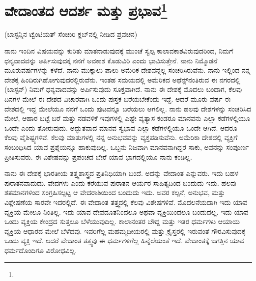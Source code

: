 
\chapter[ವೇದಾಂತದ ಆದರ್ಶ ಮತ್ತು ಪ್ರಭಾವ]{ವೇದಾಂತದ ಆದರ್ಶ ಮತ್ತು ಪ್ರಭಾವ\protect\footnote{}}

\begin{center}
(ಬಾಸ್ಟನ್ನಿನ ಟ್ವೆಂಟಿಯತ್ ಸೆಂಚುರಿ ಕ್ಲಬ್‌ನಲ್ಲಿ ನೀಡಿದ ಪ್ರವಚನ)
\end{center}

ನಾನು ಇಂದಿನ ವಿಷಯವನ್ನು ಕುರಿತು ಮಾತನಾಡುವುದಕ್ಕೆ ಮುಂಚೆ ಸ್ವಲ್ಪ ಕಾಲಾವಕಾಶವಿರುವುದರಿಂದ, ನಿಮಗೆ ಧನ್ಯವಾದವನ್ನು ಅರ್ಪಿಸುವುದಕ್ಕೆ ನನಗೆ ಅವಕಾಶ ಕೊಡುವಿರಿ ಎಂದು ಭಾವಿಸುತ್ತೇನೆ. ನಾನು ನಿಮ್ಮೊಡನೆ ಮೂರುವರ್ಷಗಳನ್ನು ಕಳೆದೆ. ನಾನು ಮುಕ್ಕಾಲು ಪಾಲು ಅಮೆರಿಕ ದೇಶವನ್ನೆಲ್ಲ ಸಂಚರಿಸಿರುವೆನು. ನಾನು ಇಲ್ಲಿಂದ ನನ್ನ ದೇಶಕ್ಕೆ ಹಿಂದಿರುಗಿಹೋಗುವುದರಲ್ಲಿರುವೆನು. ಇಂತಹ ಸಮಯದಲ್ಲಿ ಅಮೆರಿಕದ ಅಥೆನ್ಸ್‌ನಂತಿರುವ ಈ ನಗರದಲ್ಲಿ (ಬಾಸ್ಟನ್) ನಿಮಗೆ ಧನ್ಯವಾದವನ್ನು ಅರ್ಪಿಸುವುದು ಸೂಕ್ತವಾಗಿದೆ. ನಾನು ಈ ದೇಶಕ್ಕೆ ಮೊದಲು ಬಂದಾಗ, ಕೆಲವು ದಿನಗಳ ಮೇಲೆ ಈ ದೇಶದ ವಿಚಾರವಾಗಿ ಒಂದು ಪುಸ್ತಕ ಬರೆಯಬೇಕೆಂದು ಇದ್ದೆ. ಆದರೆ ಮೂರು ವರ್ಷ ಈ ದೇಶದಲ್ಲಿ ಇದ್ದ ಮೇಲೆಯೂ ನನಗೆ ಒಂದು ಪುಟವನ್ನೂ ಬರೆಯಲು ಆಗಲಿಲ್ಲ. ನಾನು ಹಲವು ದೇಶಗಳನ್ನು ಸಂಚರಿಸಿದ ಮೇಲೆ, ಆಹಾರ ಬಟ್ಟೆ ಬರೆ ಮತ್ತು ನಡವಳಿಕೆ ಇವುಗಳಲ್ಲಿ ಎಷ್ಟೇ ವ್ಯತ್ಯಾಸ ಕಂಡರೂ ಮಾನವನು ಎಲ್ಲಾ ಕಡೆಗಳಲ್ಲಿಯೂ ಒಂದೇ ಎಂದು ತೋರುವುದು. ಅದ್ಭುತವಾದ ಮಾನವ ಸ್ವಭಾವ ಎಲ್ಲಾ ಕಡೆಗಳಲ್ಲಿಯೂ ಒಂದೇ ಆಗಿದೆ. ಆದರೂ ಕೆಲವು ವೈಶಿಷ್ಟ್ಯಗಳಿವೆ. ಕೆಲವು ಮಾತುಗಳಲ್ಲಿ ನನ್ನ ಅನುಭವವನ್ನು ವ್ಯಕ್ತಪಡಿಸುವೆನು. ಅಮೆರಿಕಾ ದೇಶದಲ್ಲಿ ವ್ಯಕ್ತಿಗೆ ಸಂಬಂಧಿಸಿದ ಯಾವ ಪ್ರಶ್ನೆಯನ್ನೂ ಹಾಕುವುದಿಲ್ಲ. ಒಬ್ಬನು ನಿಜವಾಗಿ ಮಾನವನಾಗಿದ್ದರೆ ಸಾಕು, ಅವನನ್ನು ಸಂಪೂರ್ಣ ಪ್ರೀತಿಸುವರು. ಈ ವಿಶೇಷವನ್ನು ಪ್ರಪಂಚದ ಬೇರೆ ಯಾವ ಭಾಗದಲ್ಲಿಯೂ ನಾನು ಕಂಡಿಲ್ಲ.

ನಾನು ಈ ದೇಶಕ್ಕೆ ಭಾರತೀಯ ತತ್ತ್ವಶಾಸ್ತ್ರದ ಪ್ರತಿನಿಧಿಯಾಗಿ ಬಂದೆ. ಅದನ್ನು ವೇದಾಂತ ಎನ್ನುವರು. ಇದು ಬಹಳ ಪುರಾತನವಾದುದು. ವೇದಗಳು ಎಂದು ಕರೆಯುವ ಪುರಾತನ ಆರ್ಯರ ಸಾಹಿತ್ಯದಿಂದ ಬಂದುದು ಇದು. ಹಲವು ಶತಮಾನಗಳಿಂದ ಸಂಗ್ರಹಿಸಲ್ಪಟ್ಟ ಆ ವೇದರಾಶಿಯಿಂದ ಬಂದುದು ಇದು. ಅವರ ಕಲ್ಪನೆ, ಅನುಭವ, ಮತ್ತು ವಿಶ್ಲೇಷಣೆಯ ಸಾರವೇ ಇದರಲ್ಲಿದೆ. ಈ ವೇದಾಂತ ತತ್ತ್ವದಲ್ಲಿ ಕೆಲವು ವಿಶೇಷಗಳಿವೆ. ಮೊದಲನೆಯದಾಗಿ ಇದು ಯಾವ ವ್ಯಕ್ತಿಯ ಮೇಲೂ ನಿಂತಿಲ್ಲ. ಇದು ಯಾವ ದೇವದೂತನಿಂದಲೂ ಅಥವಾ ವ್ಯಕ್ತಿಯಿಂದಲೂ ಬಂದುದಲ್ಲ. ಇದು ಯಾವ ಒಂದು ವ್ಯಕ್ತಿಯ ಕೇಂದ್ರದ ಸುತ್ತಲೂ ಬೆಳೆಯುವುದಿಲ್ಲ. ಕಾಲಾನಂತರ ಬೌದ್ದ ಮತ್ತು ಇತರ ಧರ್ಮಗಳು ಆಯಾಯ ವ್ಯಕ್ತಿಯ ಆಧಾರದ ಮೇಲೆ ಬೆಳೆದವು. ಇವರಿಗೆಲ್ಲ ಮಹಮ್ಮದೀಯರಲ್ಲಿ ಮತ್ತು ಕ್ರೈಸ್ತರಲ್ಲಿ ಇರುವಂತೆ ಗೌರವಿಸುವುದಕ್ಕೆ ಒಂದು ವ್ಯಕ್ತಿ ಇದೆ. ಆದರೆ ವೇದಾಂತ ತತ್ತ್ವವು ಈ ಧರ್ಮಗಳಿಗೆಲ್ಲ ಹಿನ್ನೆಲೆಯಂತೆ ಇದೆ. ವೇದಾಂತಕ್ಕೆ ಜಗತ್ತಿನ ಯಾವ ಧರ್ಮದೊಂದಿಗೂ ವಿರೋಧವಿಲ್ಲ.

